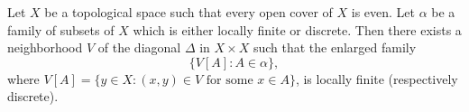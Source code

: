 Let $X$ be a topological space such that every open cover of $X$ is even. Let $\alpha$ be a family of subsets of $X$ which is either locally finite or discrete. Then there exists a neighborhood $V$ of the diagonal $\Delta$ in $X \times X$ such that the enlarged family
\[
\{V[A] : A \in \alpha\},
\]
where $V[A] = \{y \in X : (x, y) \in V \text{ for some } x \in A\}$, is locally finite (respectively discrete).
